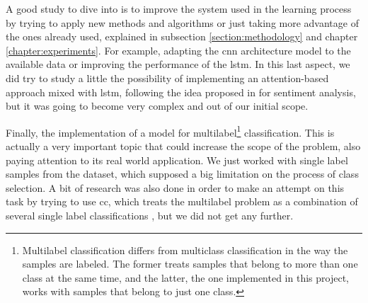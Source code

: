 	 A good study to dive into is to improve the system used in the learning process by trying to apply new methods and algorithms or just taking more advantage of the ones already used, explained in subsection \ref{section:methodology} and chapter \ref{chapter:experiments}. For example, adapting the \acrshort{cnn} architecture model to the available data or improving the performance of the \acrshort{lstm}. In this last aspect, we did try to study a little the possibility of implementing an attention-based approach mixed with \acrshort{lstm}, following the idea proposed in \cite{Wang2016a} for sentiment analysis, but it was going to become very complex and out of our initial scope.
	 
	 Finally, the implementation of a model for multilabel\footnote{Multilabel classification differs from multiclass classification in the way the samples are labeled. The former treats samples that belong to more than one class at the same time, and the latter, the one implemented in this project, works with samples that belong to just one class.} classification. This is actually a very important topic that could increase the scope of the problem, also paying attention to its real world application. We just worked with single label samples from the dataset, which supposed a big limitation on the process of class selection. A bit of research was also done in order to make an attempt on this task by trying to use \acrfull{cc}, which treats the multilabel problem as a combination of several single label classifications \cite{Read2011}, but we did not get any further.
	 